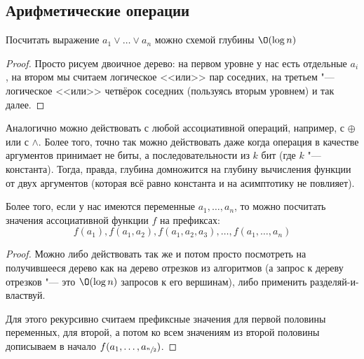 \subsection{Арифметические операции}
	\begin{lemma}
		Посчитать выражение $a_1 \lor \dots \lor a_n$ можно схемой глубины $\O(\log n)$
	\end{lemma}
	\begin{proof}
		Просто рисуем двоичное дерево: на первом уровне у нас есть отдельные $a_i$, на втором мы считаем логическое <<или>> пар соседних,
		на третьем "--- логическое <<или>> четвёрок соседних (пользуясь вторым уровнем) и так далее.
	\end{proof}
	\begin{Rem}
		Аналогично можно действовать с любой ассоциативной операций, например, с $\oplus$ или с $\land$.
		Более того, точно так можно действовать даже когда операция в качестве аргументов принимает не биты, а последовательности из $k$ бит (где $k$ "--- константа).
		Тогда, правда, глубина домножится на глубину вычисления функции от двух аргументов (которая всё равно константа и на асимптотику не повлияет).
	\end{Rem}

	\begin{lemma}
		Более того, если у нас имеются переменные $a_1, \dots, a_n$, то можно посчитать значения ассоциативной функции $f$ на префиксах:
		\[ f(a_1), f(a_1, a_2), f(a_1, a_2, a_3), \dots, f(a_1, \dots, a_n) \]
	\end{lemma}
	\begin{proof}
		Можно либо действовать так же и потом просто посмотреть на получившееся дерево как на дерево отрезков из алгоритмов (а запрос к дереву отрезков "--- это $\O(\log n)$ запросов к его вершинам),
		либо применить разделяй-и-властвуй.

		Для этого рекурсивно считаем префиксные значения для первой половины переменных, для второй, а потом ко всем значениям из второй половины дописываем в начало
		$f(a_1, \dots, a_{\sfrac n2})$.
	\end{proof}

